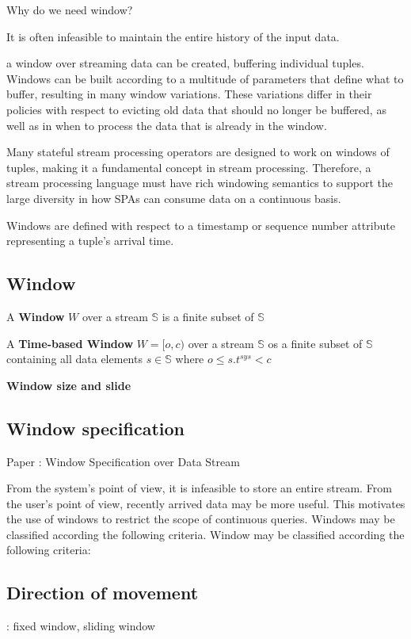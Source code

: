 Why do we need window?

It is often infeasible to maintain the entire history of the input data.


\citep{Henrique:2014} a window over streaming data can be created, buffering individual tuples. Windows can be built according to a multitude of parameters that define what to buffer, resulting in many window variations. These variations differ in their policies with respect to evicting old data that should no longer be buffered, as well as in when to process the data that is already in the window.


Many stateful stream processing operators are designed to work on windows of tuples, making it a fundamental concept in stream processing. Therefore, a stream processing language must have rich windowing semantics to support the large diversity in how SPAs can consume data on a continuous basis.

Windows are defined with respect to a timestamp or sequence number attribute representing  a tuple's arrival time.



\subsection*{Window} \cite{Dindar:2013}
A \textbf{Window} $W$ over a stream $\mathbb{S}$ is a finite subset of $\mathbb{S}$ \cite{Dindar:2013}

A \textbf{Time-based Window} $W = [o,c)$ over a stream $\mathbb{S}$ os a finite subset of $\mathbb{S}$ containing all data elements $s \in \mathbb{S}$ where $o \leq s.t^{sys} <c$ \cite{Dindar:2013}

\textbf{Window size and slide}  \citep{Dindar:2013}



\subsection*{Window specification}

Paper : Window Specification over Data Stream

From the system’s point of view, it is infeasible to store an entire stream. From the user’s point of view, recently arrived data may be more useful. This motivates the use of windows to restrict the scope of continuous queries. Windows may be classified according the following criteria. Window may be classified according the following criteria:

\subsection{Direction of movement}: fixed window, sliding window

